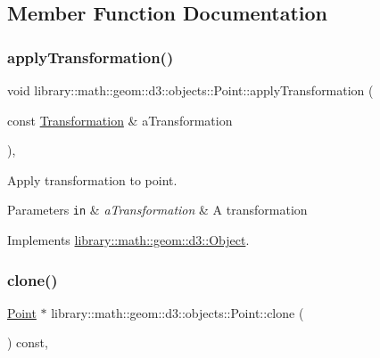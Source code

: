\subsection{Member Function Documentation}
\mbox{\label{classlibrary_1_1math_1_1geom_1_1d3_1_1objects_1_1_point_ad2052f6ef5df88b75cae09c58a678f95}} 
\subsubsection{\texorpdfstring{apply\+Transformation()}{applyTransformation()}}
{\footnotesize\ttfamily void library\+::math\+::geom\+::d3\+::objects\+::\+Point\+::apply\+Transformation (\begin{DoxyParamCaption}\item[{const \hyperlink{classlibrary_1_1math_1_1geom_1_1d3_1_1_transformation}{Transformation} \&}]{a\+Transformation }\end{DoxyParamCaption})\hspace{0.3cm}{\ttfamily [override]}, {\ttfamily [virtual]}}



Apply transformation to point. 


\begin{DoxyParams}[1]{Parameters}
\mbox{\tt in}  & {\em a\+Transformation} & A transformation \\
\hline
\end{DoxyParams}


Implements \hyperlink{classlibrary_1_1math_1_1geom_1_1d3_1_1_object_a5fc47b1ee5d9a28efc6010d3d1512470}{library\+::math\+::geom\+::d3\+::\+Object}.

\mbox{\label{classlibrary_1_1math_1_1geom_1_1d3_1_1objects_1_1_point_a32aa1e233c6ac5341605961f6bf0f210}} 
\subsubsection{\texorpdfstring{clone()}{clone()}}
{\footnotesize\ttfamily \hyperlink{classlibrary_1_1math_1_1geom_1_1d3_1_1objects_1_1_point}{Point} $\ast$ library\+::math\+::geom\+::d3\+::objects\+::\+Point\+::clone (\begin{DoxyParamCaption}{ }\end{DoxyParamCaption}) const\hspace{0.3cm}{\ttfamily [override]}, {\ttfamily [virtual]}}



